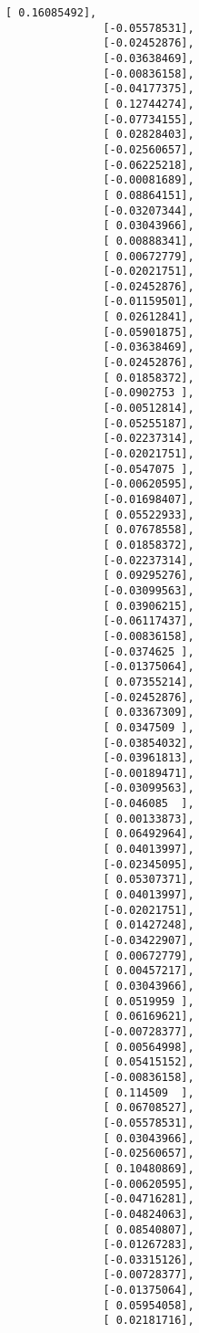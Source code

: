 \documentclass[11pt]{article}
\begin{document}
\begin{Verbatim}[commandchars=\\\{\}]
               [ 0.16085492],
               [-0.05578531],
               [-0.02452876],
               [-0.03638469],
               [-0.00836158],
               [-0.04177375],
               [ 0.12744274],
               [-0.07734155],
               [ 0.02828403],
               [-0.02560657],
               [-0.06225218],
               [-0.00081689],
               [ 0.08864151],
               [-0.03207344],
               [ 0.03043966],
               [ 0.00888341],
               [ 0.00672779],
               [-0.02021751],
               [-0.02452876],
               [-0.01159501],
               [ 0.02612841],
               [-0.05901875],
               [-0.03638469],
               [-0.02452876],
               [ 0.01858372],
               [-0.0902753 ],
               [-0.00512814],
               [-0.05255187],
               [-0.02237314],
               [-0.02021751],
               [-0.0547075 ],
               [-0.00620595],
               [-0.01698407],
               [ 0.05522933],
               [ 0.07678558],
               [ 0.01858372],
               [-0.02237314],
               [ 0.09295276],
               [-0.03099563],
               [ 0.03906215],
               [-0.06117437],
               [-0.00836158],
               [-0.0374625 ],
               [-0.01375064],
               [ 0.07355214],
               [-0.02452876],
               [ 0.03367309],
               [ 0.0347509 ],
               [-0.03854032],
               [-0.03961813],
               [-0.00189471],
               [-0.03099563],
               [-0.046085  ],
               [ 0.00133873],
               [ 0.06492964],
               [ 0.04013997],
               [-0.02345095],
               [ 0.05307371],
               [ 0.04013997],
               [-0.02021751],
               [ 0.01427248],
               [-0.03422907],
               [ 0.00672779],
               [ 0.00457217],
               [ 0.03043966],
               [ 0.0519959 ],
               [ 0.06169621],
               [-0.00728377],
               [ 0.00564998],
               [ 0.05415152],
               [-0.00836158],
               [ 0.114509  ],
               [ 0.06708527],
               [-0.05578531],
               [ 0.03043966],
               [-0.02560657],
               [ 0.10480869],
               [-0.00620595],
               [-0.04716281],
               [-0.04824063],
               [ 0.08540807],
               [-0.01267283],
               [-0.03315126],
               [-0.00728377],
               [-0.01375064],
               [ 0.05954058],
               [ 0.02181716],

\end{Verbatim}
\end{document}
